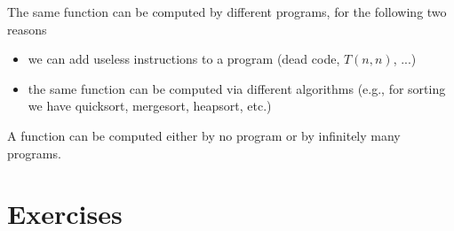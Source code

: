 \begin{remark}
  The same function can be computed by different programs, for the following two reasons

  \begin{itemize}
  \item we can add useless instructions to a program (dead code, $T(n,n)$, ...)

  \item the same function can be computed via different algorithms
    (e.g., for sorting we have quicksort, mergesort, heapsort, etc.)
  \end{itemize}

  A function can be computed either by no program or by infinitely many programs.
\end{remark}

\section{Exercises}

